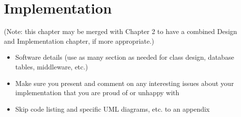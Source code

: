 \chapter{Implementation}


(Note: this chapter may be merged with Chapter 2 to have a combined Design 
and Implementation chapter, if more appropriate.)

\begin{itemize}
\item{} Software details (use as many section as needed for class design, 
database tables, middleware, etc.)

\item{} Make sure you present and comment on any interesting issues about
your implementation that you are proud of or unhappy with

\item{} Skip code listing and specific UML diagrams, etc. to an appendix

\end{itemize}
